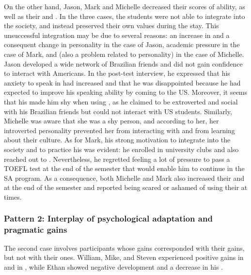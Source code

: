 \documentclass[output=paper]{langsci/langscibook}
\begin{document}
On the other hand, Jason, Mark and Michelle decreased their scores of  ability, as well as their  and . In the three cases, the students were not able to integrate into the  society, and instead preserved their own  values during the stay. This unsuccessful integration may be due to several reasons: an increase in  and a consequent change in personality in the case of Jason, academic pressure in the case of Mark, and  (also a problem related to personality) in the case of Michelle. Jason developed a wide network of Brazilian friends and did not gain confidence to interact with Americans. In the post-test interview, he expressed that his anxiety to speak in  had increased and that he was disappointed because he had expected to improve his speaking ability by coming to the US. Moreover, it seems that his  made him shy when using , as he claimed to be extroverted and social with his Brazilian friends but could not interact with US students. Similarly, Michelle was aware that she was a shy person, and according to her, her introverted personality prevented her from interacting with  and from learning about their culture. As for Mark, his strong motivation to integrate into the society and to practice his  was evident: he enrolled in university clubs and also reached out to . Nevertheless, he regretted feeling a lot of pressure to pass a TOEFL test at the end of the semester that would enable him to continue in the SA program. As a consequence, both Michelle and Mark also increased their  and at the end of the semester and reported being scared or ashamed of using their  at times.


\subsubsection{Pattern 2: Interplay of psychological adaptation and pragmatic gains}
 
The second case involves participants whose  gains corresponded with their  gains, but not with their  ones. Wil\-liam, Mike, and Steven experienced positive gains in  and in , while Ethan showed negative  development and a decrease in his .
\end{document}
